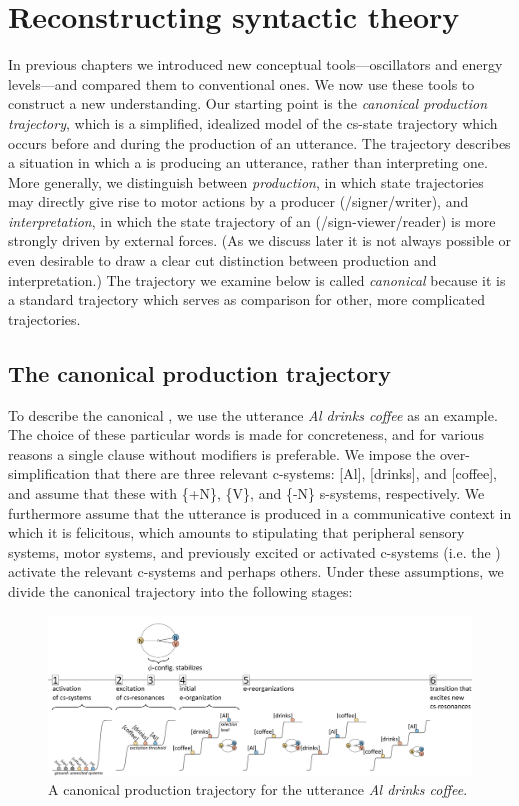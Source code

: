 \chapter{Reconstructing syntactic theory}

In previous chapters we introduced new conceptual tools—oscillators and energy levels—and compared them to conventional ones. We now use these tools to construct a new understanding. Our starting point is the \textit{canonical production trajectory}, which is a simplified, idealized model of the cs-state trajectory which occurs before and during the production of an utterance. The trajectory describes a situation in which a  is producing an utterance, rather than interpreting one. More generally, we distinguish between \textit{production}, in which state trajectories may directly give rise to motor actions by a producer (/signer/writer), and \textit{interpretation}, in which the state trajectory of an  (/sign-viewer/reader) is more strongly driven by external forces. (As we discuss later it is not always possible or even desirable to draw a clear cut distinction between production and interpretation.) The trajectory we examine below is called \textit{canonical} because it is a standard trajectory which serves as comparison for other, more complicated trajectories.

\section{The canonical production trajectory}

To describe the canonical , we use the utterance \textit{Al drinks coffee} as an example. The choice of these particular words is made for concreteness, and for various reasons a single clause without modifiers is preferable. We impose the over-simplification that there are three relevant c-systems: [Al], [drinks], and [coffee], and assume that these  with \{+N\}, \{V\}, and \{-N\} s-systems, respectively. We furthermore assume that the utterance is produced in a communicative context in which it is felicitous, which amounts to stipulating that peripheral sensory systems, motor systems, and previously excited or activated c-systems (i.e. the ) activate the relevant c-systems and perhaps others. Under these assumptions, we divide the canonical trajectory into the following stages:

  
\begin{figure}
\includegraphics[width=\textwidth]{figures/Tilsen-img51.png}
\caption{A canonical production trajectory for the utterance \textit{Al drinks coffee}.}
\label{fig:4:1}
\end{figure}
 

